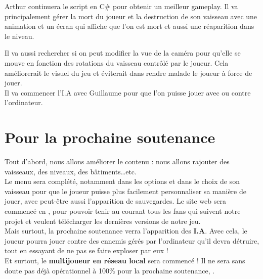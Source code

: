 \documentclass[10pt, titlepage]{report}
\begin{document}
Arthur continuera le script en C\# pour obtenir un meilleur gameplay. Il va principalement gérer la mort du joueur et la destruction de son vaisseau avec une animation et un écran qui affiche que l'on est mort et aussi une réaparition dans le niveau. 

 Il va aussi rechercher si on peut modifier la vue de la caméra pour qu'elle se mouve en fonction des rotations du vaisseau contrôlé par le joueur. Cela améliorerait le visuel du jeu et éviterait dans rendre malade le joueur à force de jouer.\\

Il va commencer l'I.A avec Guillaume pour que l'on puisse jouer avec ou contre l'ordinateur.

\chapter{Pour la prochaine soutenance}

Tout d'abord, nous allons améliorer le contenu : nous allons rajouter des vaisseaux, des niveaux, des bâtiments\dots etc.\\
Le menu sera complété, notamment dans les options et dans le choix de son vaisseau pour que le joueur puisse plus facilement personnaliser sa manière de jouer, avec peut-être aussi l'apparition de sauvegardes.
Le site web sera commencé en , pour pouvoir tenir au courant tous les fans qui suivent notre projet et veulent télécharger les dernières versions de notre jeu.\\

Mais surtout, la prochaine soutenance verra l'apparition des \textbf{I.A}. Avec cela, le joueur pourra jouer contre des ennemis gérés par l'ordinateur qu'il devra détruire, tout en essayant de ne pas se faire exploser par eux !\\

 Et surtout, le \textbf{multijoueur en réseau local} sera commencé ! Il ne sera sans doute pas déjà opérationnel à 100\% pour la prochaine soutenance, .
\end{document}
